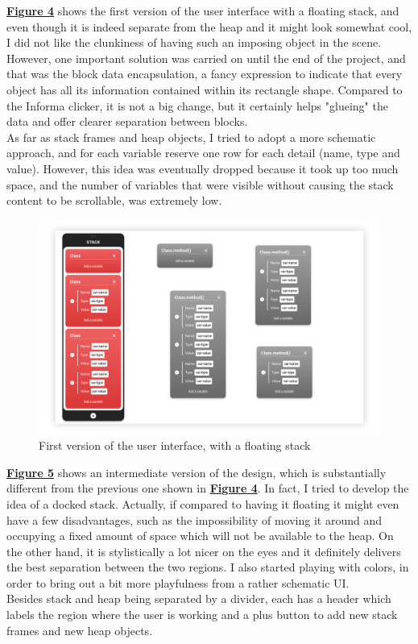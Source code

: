 \documentclass[]{usiinfbachelorproject}
\begin{document}
\noindent \hyperref[floating stack]{\textbf{Figure 4}} shows the first version of the user interface with a floating stack, and even though it is indeed separate from the heap and it might look somewhat cool, I did not like the clunkiness of having such an imposing object in the scene. However, one important solution was carried on until the end of the project, and that was the block data encapsulation, a fancy expression to indicate that every object has all its information contained within its rectangle shape. Compared to the Informa clicker, it is not a big change, but it certainly helps "glueing" the data and offer clearer separation between blocks.\\
As far as stack frames and heap objects, I tried to adopt a more schematic approach, and for each variable reserve one row for each detail (name, type and value). However, this idea was eventually dropped because it took up too much space, and the number of variables that were visible without causing the stack content to be scrollable, was extremely low. 

\begin{figure}[h!]
\centering
\includegraphics[width=\textwidth]{figures/floating_stack.png}
\caption {First version of the user interface, with a floating stack}
\label{floating stack}
\end{figure}

\pagebreak

\noindent \hyperref[separate regions]{\textbf{Figure 5}} shows an intermediate version of the design, which is substantially different from the previous one shown in \hyperref[floating stack]{\textbf{Figure 4}}. In fact, I tried to develop the idea of a docked stack. Actually, if compared to having it floating it might even have a few disadvantages, such as the impossibility of moving it around and occupying a fixed amount of space which will not be available to the heap. On the other hand, it is stylistically a lot nicer on the eyes and it definitely delivers the best separation between the two regions. I also started playing with colors, in order to bring out a bit more playfulness from a rather schematic UI.\\
Besides stack and heap being separated by a divider, each has a header which labels the region where the user is working and a plus button to add new stack frames and new heap objects.
\end{document}
